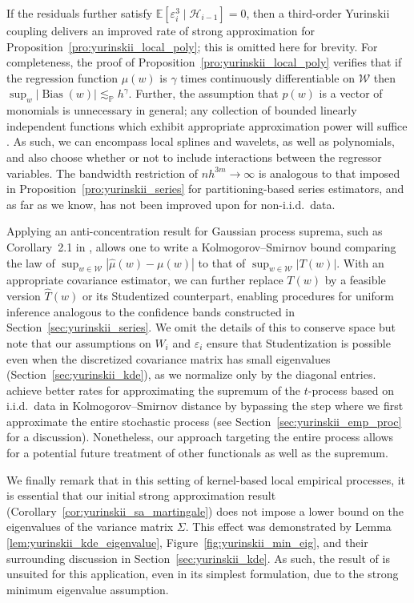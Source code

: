 \documentclass[11pt,lof]{puthesis}
\renewcommand{\P}{\ensuremath{\mathbb{P}}}
\newcommand{\E}{\ensuremath{\mathbb{E}}}
\newcommand{\cH}{\ensuremath{\mathcal{H}}}
\newcommand{\cW}{\ensuremath{\mathcal{W}}}
\DeclareMathOperator{\Bias}{Bias}
\theoremstyle{break}
\theoremstyle{proof}
\begin{document}
If the residuals further satisfy
$\E \left[ \varepsilon_i^3 \mid \cH_{i-1} \right] = 0$, then
a third-order Yurinskii coupling delivers an improved rate of strong
approximation for Proposition~\ref{pro:yurinskii_local_poly}; this is omitted
here for
brevity. For completeness, the proof of
Proposition~\ref{pro:yurinskii_local_poly}
verifies that if the regression function $\mu(w)$ is $\gamma$ times
continuously differentiable on $\cW$ then
$\sup_w |\Bias(w)| \lesssim_\P h^\gamma$. Further, the assumption that $p(w)$
is a vector of monomials is unnecessary in general; any collection of bounded
linearly independent functions which exhibit appropriate approximation power
will suffice \citep{eggermont2009maximum}. As such, we can encompass local
splines and wavelets, as well as polynomials, and also choose whether or not to
include interactions between the regressor variables. The bandwidth restriction
of $n h^{3m} \to \infty$ is analogous to that imposed in
Proposition~\ref{pro:yurinskii_series} for partitioning-based series
estimators, and as
far as we know, has not been improved upon for non-i.i.d.\ data.

Applying an anti-concentration result for Gaussian process suprema, such as
Corollary~2.1 in \citet{chernozhukov2014anti}, allows one to write a
Kolmogorov--Smirnov bound comparing the law of
$\sup_{w \in \cW}|\hat\mu(w) - \mu(w)|$ to that of $\sup_{w \in \cW}|T(w)|$.
With an appropriate covariance estimator, we can further replace $T(w)$ by a
feasible version $\hat T(w)$ or its Studentized counterpart, enabling
procedures for uniform inference analogous to the confidence bands constructed
in Section~\ref{sec:yurinskii_series}. We omit the details of this to conserve
space but
note that our assumptions on $W_i$ and $\varepsilon_i$ ensure that
Studentization is possible even when the discretized covariance matrix has
small eigenvalues (Section~\ref{sec:yurinskii_kde}), as we normalize only by
the diagonal
entries. \citet[Remark~3.1]{chernozhukov2014gaussian} achieve better rates for
approximating the supremum of the $t$-process based on i.i.d.\ data in
Kolmogorov--Smirnov distance by bypassing the step where we first approximate
the entire stochastic process (see Section~\ref{sec:yurinskii_emp_proc} for a
discussion).
Nonetheless, our approach targeting the entire process allows for a
potential future
treatment of other functionals as well as the supremum.

We finally remark that in this setting of kernel-based local empirical
processes, it is essential that our initial strong approximation result
(Corollary~\ref{cor:yurinskii_sa_martingale}) does not impose a lower bound on
the
eigenvalues of the variance matrix $\Sigma$. This effect was demonstrated by
Lemma \ref{lem:yurinskii_kde_eigenvalue},
Figure~\ref{fig:yurinskii_min_eig}, and their surrounding discussion in
Section~\ref{sec:yurinskii_kde}. As such, the result of \citet{li2020uniform} is
unsuited for this application, even in its simplest formulation,
due to the strong minimum eigenvalue assumption.
\end{document}
